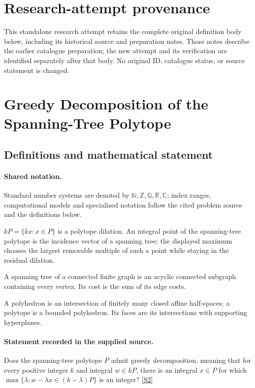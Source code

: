 \documentclass[11pt]{article}
\begin{document}
\section*{Research-attempt provenance}
This standalone research attempt retains the complete original definition body below,
including its historical source and preparation notes. Those notes describe the
earlier catalogue preparation; the new attempt and its verification are identified
separately after that body. No original ID, catalogue status, or source statement is changed.

\section{Greedy Decomposition of the Spanning-Tree Polytope}\label{statement}

\subsection{Definitions and mathematical statement}

\paragraph{Shared notation.}Standard number systems are denoted by $\mathbb N,\mathbb Z,\mathbb Q,\mathbb R,\mathbb C$; index ranges, computational models and specialized notation follow the cited problem source and the definitions below.


$kP=\{kx:x\in P\}$ is a polytope dilation. An integral point of the spanning-tree polytope is the incidence vector of a spanning tree; the displayed maximum chooses the largest removable multiple of such a point while staying in the residual dilation.

A spanning tree of a connected finite graph is an acyclic connected subgraph containing every vertex. Its cost is the sum of its edge costs.

A polyhedron is an intersection of finitely many closed affine half-spaces; a polytope is a bounded polyhedron. Its faces are its intersections with supporting hyperplanes.
\paragraph{Statement recorded in the supplied source.}
Does the spanning-tree polytope $P$ admit greedy decomposition, meaning that for every positive integer $k$ and integral $w\in kP$, there is an integral $x\in P$ for which $\max\{\lambda:w-\lambda x\in(k-\lambda)P\}$ is an integer? \href{https://doi.org/10.4171/owr/2011/53}{[S2]}
\end{document}
